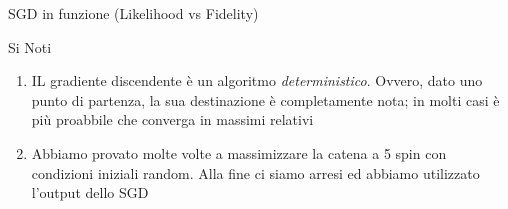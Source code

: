 \documentclass[xcolor=x11names,compress]{beamer}
\renewcommand{\(}{\begin{columns}}
\renewcommand{\)}{\end{columns}}
\newcommand{\<}[1]{\begin{column}{#1}}
\renewcommand{\>}{\end{column}}
\begin{document}
\begin{frame}{SGD in funzione \small{(Likelihood vs Fidelity)}}
\vspace{-0.5cm}

\begin{center}
Si Noti
\end{center}

\vspace{-0.5cm}


\begin{enumerate}
\item \textcolor{myNetText}{\tiny{IL gradiente discendente è un algoritmo \emph{deterministico}. Ovvero, dato uno punto di partenza, la sua destinazione è completamente nota; in molti casi è più proabbile che converga in massimi relativi}}

\item \textcolor{myNetText}{\tiny{Abbiamo provato molte volte a massimizzare la catena a 5 spin con condizioni iniziali random. Alla fine ci siamo arresi ed abbiamo utilizzato l'output dello SGD}}
\end{enumerate}

\end{frame}

\end{document}
